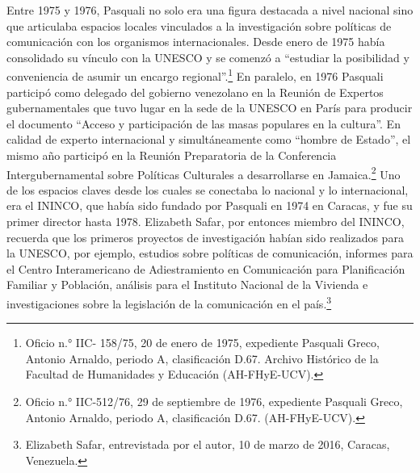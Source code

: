 \documentclass{tufte-handout}
\begin{document}
Entre 1975 y 1976, Pasquali no solo era una figura destacada a nivel
nacional sino que articulaba espacios locales vinculados a la
investigación sobre políticas de comunicación con los organismos
internacionales. Desde enero de 1975 había consolidado su vínculo con la
UNESCO y se comenzó a ``estudiar la posibilidad y conveniencia de asumir
un encargo regional''.\footnote{Oficio n.° IIC- 158/75, 20 de enero de
  1975, expediente Pasquali Greco, Antonio Arnaldo, periodo A,
  clasificación D.67. Archivo Histórico de la Facultad de Humanidades y
  Educación (AH-FHyE-UCV).} En paralelo, en 1976 Pasquali participó como
delegado del gobierno venezolano en la Reunión de Expertos
gubernamentales que tuvo lugar en la sede de la UNESCO en París para
producir el documento ``Acceso y participación de las masas populares en
la cultura''. En calidad de experto internacional y simultáneamente como
``hombre de Estado'', el mismo año participó en la Reunión Preparatoria
de la Conferencia Intergubernamental sobre Políticas Culturales a
desarrollarse en Jamaica.\footnote{Oficio n.° IIC-512/76, 29 de
  septiembre de 1976, expediente Pasquali Greco, Antonio Arnaldo,
  periodo A, clasificación D.67. (AH-FHyE-UCV).} Uno de los espacios
claves desde los cuales se conectaba lo nacional y lo internacional, era
el ININCO, que había sido fundado por Pasquali en 1974 en Caracas, y fue
su primer director hasta 1978. Elizabeth Safar, por entonces miembro del
ININCO, recuerda que los primeros proyectos de investigación habían sido
realizados para la UNESCO, por ejemplo, estudios sobre políticas de
comunicación, informes para el Centro Interamericano de Adiestramiento
en Comunicación para Planificación Familiar y Población, análisis para
el Instituto Nacional de la Vivienda e investigaciones sobre la
legislación de la comunicación en el país.\footnote{Elizabeth Safar,
  entrevistada por el autor, 10 de marzo de 2016, Caracas, Venezuela.}
\end{document}
